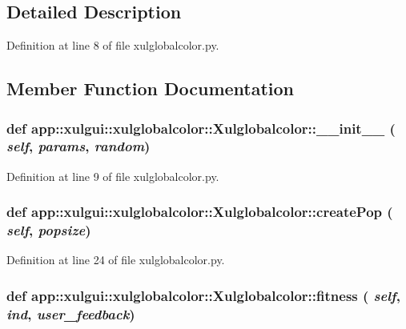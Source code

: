 \subsection{Detailed Description}


Definition at line 8 of file xulglobalcolor.py.

\subsection{Member Function Documentation}
\subsubsection{\setlength{\rightskip}{0pt plus 5cm}def app::xulgui::xulglobalcolor::Xulglobalcolor::\_\-\_\-init\_\-\_\- ( {\em self},  {\em params},  {\em random})}\label{classapp_1_1xulgui_1_1xulglobalcolor_1_1Xulglobalcolor_b6f5b808b0797a8058c0addbc260080f}




Definition at line 9 of file xulglobalcolor.py.
\subsubsection{\setlength{\rightskip}{0pt plus 5cm}def app::xulgui::xulglobalcolor::Xulglobalcolor::createPop ( {\em self},  {\em popsize})}\label{classapp_1_1xulgui_1_1xulglobalcolor_1_1Xulglobalcolor_784e9101e1bf578b5a8d9f75313bd7f9}




Definition at line 24 of file xulglobalcolor.py.
\subsubsection{\setlength{\rightskip}{0pt plus 5cm}def app::xulgui::xulglobalcolor::Xulglobalcolor::fitness ( {\em self},  {\em ind},  {\em user\_\-feedback})}\label{classapp_1_1xulgui_1_1xulglobalcolor_1_1Xulglobalcolor_03e266c082a6001e0ec0f7b48421a61e}




